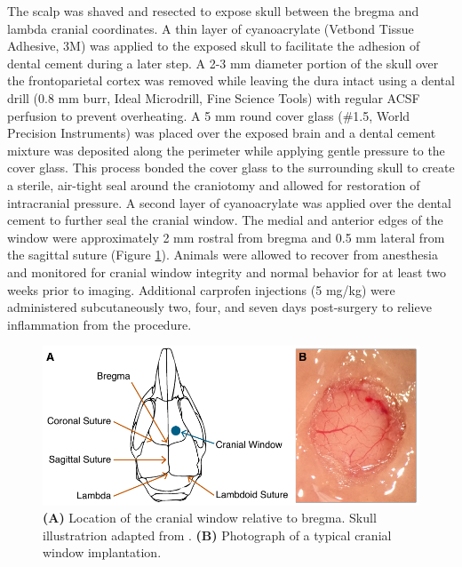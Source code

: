 The scalp was shaved and resected to expose skull between the bregma and lambda cranial coordinates. A thin layer of cyanoacrylate (Vetbond Tissue Adhesive, 3M) was applied to the exposed skull to facilitate the adhesion of dental cement during a later step. A 2-3 mm diameter portion of the skull over the frontoparietal cortex was removed while leaving the dura intact using a dental drill (0.8 mm burr, Ideal Microdrill, Fine Science Tools) with regular ACSF perfusion to prevent overheating. A 5 mm round cover glass (\#1.5, World Precision Instruments) was placed over the exposed brain and a dental cement mixture was deposited along the perimeter while applying gentle pressure to the cover glass. This process bonded the cover glass to the surrounding skull to create a sterile, air-tight seal around the craniotomy and allowed for restoration of intracranial pressure. A second layer of cyanoacrylate was applied over the dental cement to further seal the cranial window. The medial and anterior edges of the window were approximately 2 mm rostral from bregma and 0.5 mm lateral from the sagittal suture (Figure \ref{fig:cranialwindow}). Animals were allowed to recover from anesthesia and monitored for cranial window integrity and normal behavior for at least two weeks prior to imaging. Additional carprofen injections (5 mg/kg) were administered subcutaneously two, four, and seven days post-surgery to relieve inflammation from the procedure.

\begin{figure}
    \includegraphics{figures/appendix_c/cranialwindow.pdf}
    \caption[\textbf{(A)} Location of the cranial window relative to bregma. \textbf{(B)} Photograph of a typical cranial window implantation.]{
        \label{fig:cranialwindow}
        \textbf{(A)} Location of the cranial window relative to bregma. Skull illustratrion adapted from \cite{Cook:1965wb}. \textbf{(B)} Photograph of a typical cranial window implantation.
    }
\end{figure}

